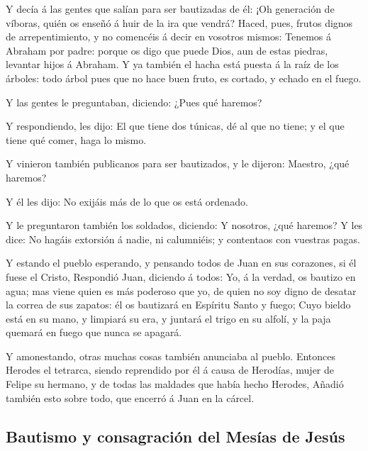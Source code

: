  Y decía á las gentes que salían para ser bautizadas de
él: ¡Oh generación de víboras, quién os enseñó á huir de la ira que
vendrá?  Haced, pues, frutos dignos de arrepentimiento, y
no comencéis á decir en vosotros mismos: Tenemos á Abraham por padre:
porque os digo que puede Dios, aun de estas piedras, levantar hijos á
Abraham.  Y ya también el hacha está puesta á la raíz de
los árboles: todo árbol pues que no hace buen fruto, es cortado, y
echado en el fuego.

 Y las gentes le preguntaban, diciendo: ¿Pues qué
haremos?

 Y respondiendo, les dijo: El que tiene dos túnicas, dé
al que no tiene; y el que tiene qué comer, haga lo mismo.

 Y vinieron también publicanos para ser bautizados, y le
dijeron: Maestro, ¿qué haremos?

 Y él les dijo: No exijáis más de lo que os está
ordenado.

 Y le preguntaron también los soldados, diciendo: Y
nosotros, ¿qué haremos? Y les dice: No hagáis extorsión á nadie, ni
calumniéis; y contentaos con vuestras pagas.

 Y estando el pueblo esperando, y pensando todos de Juan
en sus corazones, si él fuese el Cristo,  Respondió Juan,
diciendo á todos: Yo, á la verdad, os bautizo en agua; mas viene quien
es más poderoso que yo, de quien no soy digno de desatar la correa de
sus zapatos: él os bautizará en Espíritu Santo y fuego; 
Cuyo bieldo está en su mano, y limpiará su era, y juntará el trigo en su
alfolí, y la paja quemará en fuego que nunca se apagará.

 Y amonestando, otras muchas cosas también anunciaba al
pueblo.  Entonces Herodes el tetrarca, siendo reprendido
por él á causa de Herodías, mujer de Felipe su hermano, y de todas las
maldades que había hecho Herodes,  Añadió también esto
sobre todo, que encerró á Juan en la cárcel.

\hypertarget{bautismo-y-consagraciuxf3n-del-mesuxedas-de-jesuxfas}{%
\subsection{Bautismo y consagración del Mesías de
Jesús}\label{bautismo-y-consagraciuxf3n-del-mesuxedas-de-jesuxfas}}

